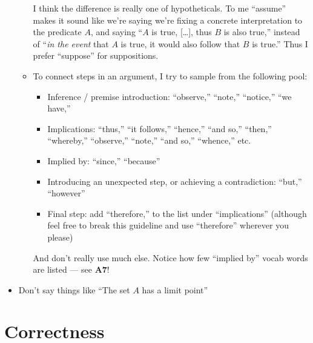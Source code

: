 \documentclass{fkpset}
\begin{document}
\begin{problem}[A9]
\begin{enumerate}
\begin{itemize}
          I think the difference is really one of hypotheticals. To me
          ``assume'' makes it sound like we're saying we're fixing a concrete
          interpretation to the predicate $A$, and saying ``$A$ is true,
          [\ldots], thus $B$ is also true,'' instead of ``\emph{in the event}
          that $A$ is true, it would also follow that $B$ is true.'' Thus I
          prefer ``suppose'' for suppositions.\\
        \item To connect steps in an argument, I try to sample from the
          following pool:
          \begin{itemize}
            \item Inference / premise introduction: ``observe,'' ``note,''
              ``notice,'' ``we have,''
            \item Implications: ``thus,'' ``it follows,'' ``hence,'' ``and so,''
              ``then,'' ``whereby,'' ``observe,''  ``note,'' ``and so,''
              ``whence,'' etc.
            \item Implied by: ``since,'' ``because''
            \item Introducing an unexpected step, or achieving a contradiction:
              ``but,'' ``however''
            \item Final step: add ``therefore,'' to the list under
              ``implications'' (although feel free to break this guideline and
              use ``therefore'' wherever you please)
          \end{itemize}
          And don't really use much else. Notice how few ``implied by'' vocab
          words are listed --- see \textbf{A7}!
      \end{itemize}
  \end{enumerate}
  \begin{itemize}
    \item Don't say things like ``The set $A$ has a limit point''
  \end{itemize}
\end{problem}
\section{Correctness}
\end{document}
